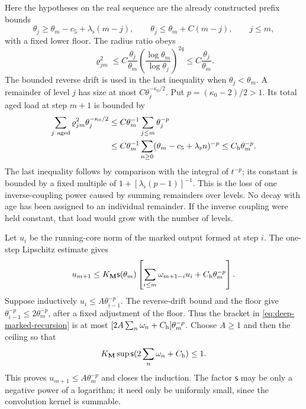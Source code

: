 \documentclass[11pt,letterpaper,reqno]{amsart}
\theoremstyle{definition}
\theoremstyle{remark}
\begin{document}
Here the hypotheses on the real sequence are the already
constructed prefix bounds
\[
 \theta_j\ge\theta_m-c_5+\lambda_\flat(m-j),\qquad
 \theta_j\le\theta_m+C(m-j),\qquad j\le m,
\]
with a fixed lower floor. The radius ratio obeys
\[
 \varrho_{jm}^2\le
 C\frac{\theta_j}{\theta_m}
             \left(\frac{\log\theta_m}{\log\theta_j}\right)^{2q}
 \le C\frac{\theta_j}{\theta_m}.
\]
The bounded reverse drift is used in the last inequality
when $\theta_j<\theta_m$. A remainder of level $j$ has size
at most $C\theta_j^{-\kappa_0/2}$. Put
$p=(\kappa_0-2)/2>1$. Its total aged load at step $m+1$
is bounded by
\begin{equation}\label{eq:deep-aged-load}
 \begin{split}
 \sum_{j\ \mathrm{aged}}\varrho_{jm}^2
                               \theta_j^{-\kappa_0/2}
 &\le C\theta_m^{-1}\sum_{j\le m}\theta_j^{-p}\\
 &\le C\theta_m^{-1}
          \sum_{n\ge0}(\theta_m-c_5+\lambda_\flat n)^{-p}
 \le C_{\rm h}\theta_m^{-p}.
 \end{split}
\end{equation}
The last inequality follows by comparison with the integral
of $t^{-p}$; its constant is bounded by a fixed multiple of
$1+[\lambda_\flat(p-1)]^{-1}$. This is the loss of one
inverse-coupling power caused by summing remainders over
levels. No decay with age has been assigned to an individual
remainder. If the inverse coupling were held constant, that
load would grow with the number of levels.

Let $u_i$ be the running-core norm of the marked output
formed at step $i$. The one-step Lipschitz estimate gives
\begin{equation}\label{eq:deep-marked-recursion}
 u_{m+1}\le K_{\mathbf M}\mathsf s(\theta_m)
       \left[\sum_{i\le m}\omega_{m+1-i}u_i
                                    +C_{\rm h}\theta_m^{-p}\right].
\end{equation}
Suppose inductively $u_i\le A\theta_{i-1}^{-p}$.
The reverse-drift bound and the floor give
$\theta_{i-1}^{-p}\le2\theta_m^{-p}$, after a fixed
adjustment of the floor. Thus the bracket in
\eqref{eq:deep-marked-recursion} is at most
$[2A\sum_n\omega_n+C_{\rm h}]\theta_m^{-p}$.
Choose $A\ge1$ and then the ceiling so that
\[
 K_{\mathbf M}\sup\mathsf s
             (2\sum_n\omega_n+C_{\rm h})\le1.
\]
This proves $u_{m+1}\le A\theta_m^{-p}$ and closes the
induction. The factor $\mathsf s$ may be only a negative
power of a logarithm; it need only be uniformly small, since
the convolution kernel is summable.
\end{document}
